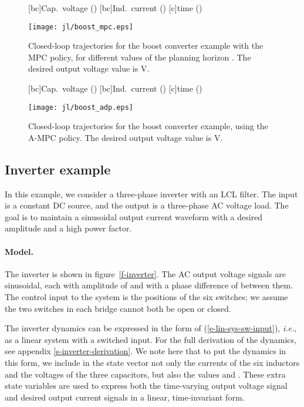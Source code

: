 \documentclass[12pt]{article}
\newcommand{\ie}{{\it i.e.}}
\newif\ifarxiv
\begin{document}
\begin{figure}
\centering
{}[bc]{Cap.\ voltage ()}
[bc]{Ind.\ current ()}
[c]{time ()}
\ifarxiv
\texttt{[image: boost\_mpc.eps]}
\else
\texttt{[image: jl/boost\_mpc.eps]}
\fi
\caption{
Closed-loop trajectories for the boost converter example with the MPC policy,
for different values of the planning horizon .
The desired output voltage value is  V.
}
\label{f-traj-mpc}
\end{figure}

\begin{figure}
\centering
{}[bc]{Cap.\ voltage ()}
[bc]{Ind.\ current ()}
[c]{time ()}
\ifarxiv
\texttt{[image: boost\_adp.eps]}
\else
\texttt{[image: jl/boost\_adp.eps]}
\fi
\caption{
Closed-loop trajectories for the boost converter example,
using the A-MPC policy.
The desired output voltage value is  V.
}
\label{f-traj}
\end{figure}
















\subsection{Inverter example}
\label{s-inverter-example}
In this example, we consider a three-phase inverter
with an LCL filter.
The input is a constant DC source,
and the output is a three-phase AC voltage load.
The goal is to maintain a sinusoidal output current waveform
with a desired amplitude and a high power factor.

\paragraph{Model.}
The inverter is shown in figure~\ref{f-inverter}.
The AC output voltage signals are sinusoidal,
each with amplitude of 
and with a phase difference of  between them.
The control input to the system is the positions of the six switches;
we assume the two switches in each bridge cannot both be open or closed.

The inverter dynamics can be expressed in the form of (\ref{e-lin-sys-sw-input}),
\ie, as a linear system with a switched input.
For the full derivation of the dynamics,
see appendix \ref{s-inverter-derivation}.
We note here that to put the dynamics in this form,
we include in the state vector not only the
currents of the six inductors
and the voltages of the three capacitors,
but also the values  and .
These extra state variables are used
to express both the time-varying output voltage signal and desired output current signals
in a linear, time-invariant form.
\end{document}
